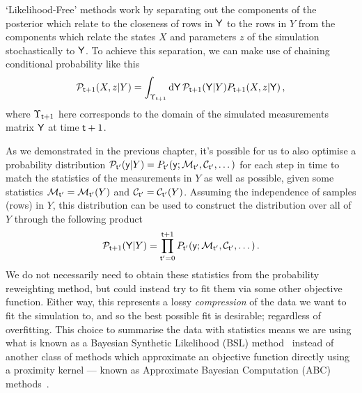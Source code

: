 `Likelihood-Free' methods work by separating out the components of the posterior which relate to the closeness of rows in ${\sf Y}$ to the rows in $Y$ from the components which relate the states $X$ and parameters $z$ of the simulation stochastically to ${\sf Y}$. To achieve this separation, we can make use of chaining conditional probability like this
\begin{align}
{\cal P}_{{\sf t}+1}(X,z\vert Y)=\int_{\Upsilon_{{\sf t}+1}} {\rm d}{\sf Y} \, {\cal P}_{{\sf t}+1}({\sf Y}\vert Y) P_{{\sf t}+1}(X,z \vert {\sf Y}) \label{eq:likelihood-free-posterior} \,,
\end{align}
where $\Upsilon_{{\sf t}+1}$ here corresponds to the domain of the simulated measurements matrix ${\sf Y}$ at time ${\sf t}+1$.

As we demonstrated in the previous chapter, it's possible for us to also optimise a probability distribution ${\cal P}_{{\sf t}'}({\sf y}\vert Y) = P_{{\sf t}'}({\sf y};{\cal M}_{{\sf t}'},{\cal C}_{{\sf t}'},\dots )$ for each step in time to match the statistics of the measurements in $Y$ as well as possible, given some statistics ${\cal M}_{{\sf t}'}={\cal M}_{{\sf t}'}(Y)$ and ${\cal C}_{{\sf t}'}={\cal C}_{{\sf t}'}(Y)$. Assuming the independence of samples (rows) in $Y$, this distribution can be used to construct the distribution over all of $Y$ through the following product
\begin{align}
{\cal P}_{{\sf t}+1}({\sf Y}\vert Y) = \prod_{{\sf t}'=0}^{{\sf t}+1}P_{{\sf t}'}({\sf y};{\cal M}_{{\sf t}'},{\cal C}_{{\sf t}'},\dots ) \,.
\end{align}
We do not necessarily need to obtain these statistics from the probability reweighting method, but could instead try to fit them via some other objective function. Either way, this represents a lossy \emph{compression} of the data we want to fit the simulation to, and so the best possible fit is desirable; regardless of overfitting. This choice to summarise the data with statistics means we are using what is known as a Bayesian Synthetic Likelihood (BSL) method~\cite{price2018bayesian,wood2010statistical} instead of another class of methods which approximate an objective function directly using a proximity kernel --- known as Approximate Bayesian Computation (ABC) methods~\cite{sisson2018handbook}.

